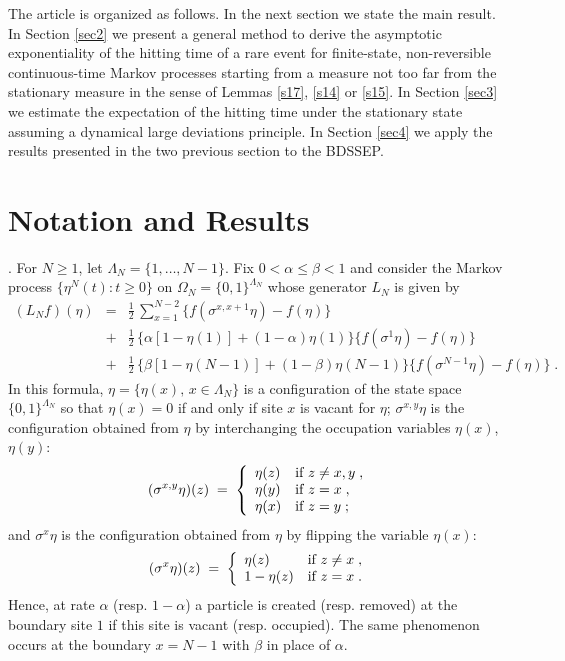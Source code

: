 \documentclass[reqno]{amsart}
\begin{document}
The article is organized as follows. In the next section we state the
main result. In Section \ref{sec2} we present a general method to
derive the asymptotic exponentiality of the hitting time of a rare
event for finite-state, non-reversible continuous-time Markov
processes starting from a measure not too far from the stationary
measure in the sense of Lemmas \ref{s17}, \ref{s14} or \ref{s15}. In
Section \ref{sec3} we estimate the expectation of the hitting time
under the stationary state assuming a dynamical large deviations
principle. In Section \ref{sec4} we apply the results presented in the
two previous section to the BDSSEP.

\section{Notation and Results}
\label{sec1}

. For $N\ge 1$, let $\Lambda_N =\{1,
\dots, N-1\}$.  Fix $0< \alpha\le \beta< 1$ and consider the Markov
process $\{\eta^N(t) : t\ge 0\}$ on $\Omega_N = \{0,1\}^{\Lambda_N}$
whose generator $L_N$ is given by
\begin{eqnarray*}
(L_N f)(\eta) &=& \frac 12 \, \sum_{x=1}^{N-2} \{ f(\sigma^{x,x+1}
\eta)-f(\eta)\} \\
&+& \frac 12 \, \Big\{ \alpha [1-\eta(1)] + (1-\alpha) \eta(1) \Big\}
\{ f(\sigma^{1} \eta)-f(\eta)\} \\
&+& \frac 12 \, \Big\{ \beta [1-\eta(N-1)] + (1-\beta) \eta(N-1) \Big\}
\{ f(\sigma^{N-1} \eta)-f(\eta)\}\;.
\end{eqnarray*}
In this formula, $\eta = \{\eta(x),\, x\in\Lambda_N\}$ is a
configuration of the state space $\{0,1\}^{\Lambda_N}$ so that $\eta
(x)=0$ if and only if site $x$ is vacant for $\eta$;
$\sigma^{x,y}\eta$ is the configuration obtained from $\eta$ by
interchanging the occupation variables $\eta(x)$, $\eta(y)$:
$$
(\sigma^{x,y} \eta) (z)\; =\;
\left\{
\begin{array}{ll}
\eta (z)  & \hbox{if $z\neq x,y$}\; , \\
\eta (y)  & \hbox{if $ z=x$}\; , \\
\eta (x)  & \hbox{if $ z=y$}\; ;
\end{array}
\right.
$$
and $\sigma^{x}\eta$ is the configuration obtained from $\eta$ by
flipping the variable $\eta(x)$:
$$
(\sigma^{x} \eta) (z)\; =\;
\left\{
\begin{array}{ll}
\eta (z)  & \hbox{if $z\neq x$}\; , \\
1-\eta (z)  & \hbox{if $ z=x$}\; .
\end{array}
\right.
$$
Hence, at rate $\alpha$ (resp. $1-\alpha$) a particle is created
(resp. removed) at the boundary site $1$ if this site is vacant (resp.
occupied). The same phenomenon occurs at the boundary $x=N-1$ with
$\beta$ in place of $\alpha$.
\end{document}
